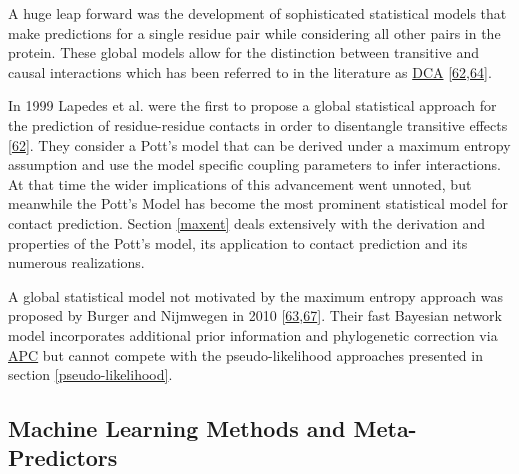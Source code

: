 \documentclass[11pt,a4paper,twoside]{book}
\theoremstyle{definition}
\theoremstyle{definition}
\theoremstyle{remark}
\begin{document}
A huge leap forward was the development of sophisticated statistical
models that make predictions for a single residue pair while considering
all other pairs in the protein. These global models allow for the
distinction between transitive and causal interactions which has been
referred to in the literature as \protect\hyperlink{abbrev}{DCA}
{[}\protect\hyperlink{ref-Lapedes1999}{62},\protect\hyperlink{ref-Weigt2009}{64}{]}.

In 1999 Lapedes et al. were the first to propose a global statistical
approach for the prediction of residue-residue contacts in order to
disentangle transitive effects
{[}\protect\hyperlink{ref-Lapedes1999}{62}{]}. They consider a Pott's
model that can be derived under a maximum entropy assumption and use the
model specific coupling parameters to infer interactions. At that time
the wider implications of this advancement went unnoted, but meanwhile
the Pott's Model has become the most prominent statistical model for
contact prediction. Section \ref{maxent} deals extensively with the
derivation and properties of the Pott's model, its application to
contact prediction and its numerous realizations.

A global statistical model not motivated by the maximum entropy approach
was proposed by Burger and Nijmwegen in 2010
{[}\protect\hyperlink{ref-Burger2010}{63},\protect\hyperlink{ref-Burger2008}{67}{]}.
Their fast Bayesian network model incorporates additional prior
information and phylogenetic correction via
\protect\hyperlink{abbrev}{APC} but cannot compete with the
pseudo-likelihood approaches presented in section
\ref{pseudo-likelihood}.

\subsection{Machine Learning Methods and
Meta-Predictors}\label{meta-predictors}
\end{document}
